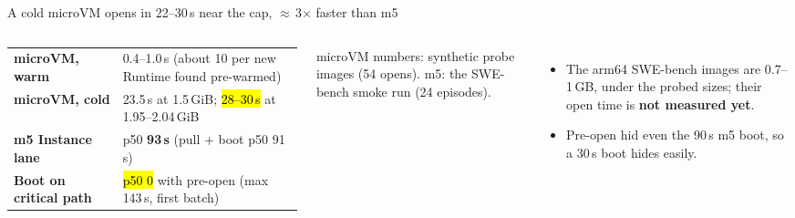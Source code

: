 \begin{frame}{A cold microVM opens in 22--30\,s near the cap, $\approx$\,3$\times$ faster than m5}
\begin{columns}[T]
\scriptsize
\begin{tabularx}{\linewidth}{@{}>{\bfseries}p{2.5cm}X@{}}
\toprule
microVM, warm & 0.4--1.0\,s (about 10 per new Runtime found pre-warmed)\\
microVM, cold & 23.5\,s at 1.5\,GiB; \hl{28--30\,s} at 1.95--2.04\,GiB\\
m5 Instance lane & p50 \textbf{93\,s} (pull + boot p50 91\,s)\\
Boot on critical path & \hl{p50 0} with pre-open (max 143\,s, first batch)\\
\bottomrule
\end{tabularx}
\par\vspace{1mm}
{\tiny\color{inkmuted}microVM numbers: synthetic probe images (54 opens). m5: the SWE-bench smoke run (24 episodes).\par}
\begin{itemize}\footnotesize\setlength{\itemsep}{2mm}
\item The arm64 SWE-bench images are 0.7--1\,GB, under the probed sizes; their open time is \textbf{not measured yet}.
\item Pre-open hid even the 90\,s m5 boot, so a 30\,s boot hides easily.
\end{itemize}
\end{columns}
\end{frame}

